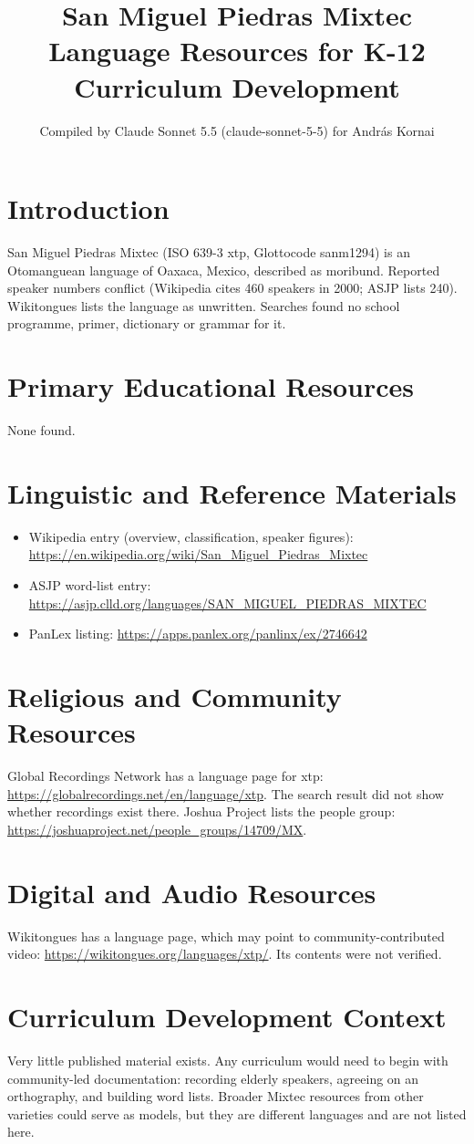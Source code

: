 \documentclass[12pt]{article}
\title{San Miguel Piedras Mixtec Language Resources for K-12 Curriculum Development}
\author{Compiled by Claude Sonnet 5.5 (claude-sonnet-5-5) for Andr\'as Kornai}
\date{}
\begin{document}
\maketitle

\section{Introduction}
San Miguel Piedras Mixtec (ISO 639-3 xtp, Glottocode sanm1294) is an Otomanguean language of Oaxaca, Mexico, described as moribund. Reported speaker numbers conflict (Wikipedia cites 460 speakers in 2000; ASJP lists 240). Wikitongues lists the language as unwritten. Searches found no school programme, primer, dictionary or grammar for it.

\section{Primary Educational Resources}
None found.

\section{Linguistic and Reference Materials}
\begin{itemize}
\item Wikipedia entry (overview, classification, speaker figures): \url{https://en.wikipedia.org/wiki/San_Miguel_Piedras_Mixtec}
\item ASJP word-list entry: \url{https://asjp.clld.org/languages/SAN_MIGUEL_PIEDRAS_MIXTEC}
\item PanLex listing: \url{https://apps.panlex.org/panlinx/ex/2746642}
\end{itemize}

\section{Religious and Community Resources}
Global Recordings Network has a language page for xtp: \url{https://globalrecordings.net/en/language/xtp}. The search result did not show whether recordings exist there. Joshua Project lists the people group: \url{https://joshuaproject.net/people_groups/14709/MX}.

\section{Digital and Audio Resources}
Wikitongues has a language page, which may point to community-contributed video: \url{https://wikitongues.org/languages/xtp/}. Its contents were not verified.

\section{Curriculum Development Context}
Very little published material exists. Any curriculum would need to begin with community-led documentation: recording elderly speakers, agreeing on an orthography, and building word lists. Broader Mixtec resources from other varieties could serve as models, but they are different languages and are not listed here.
\end{document}
